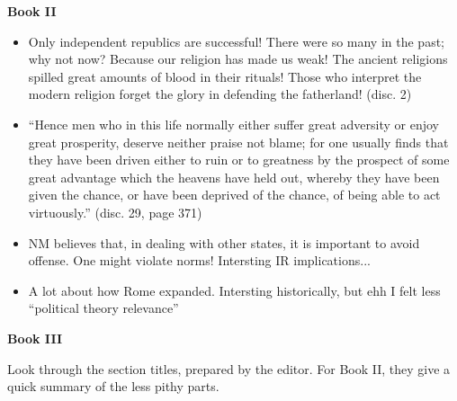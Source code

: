 \documentclass[11pt]{article}
\newcommand{\book}[1]{{\Large {\bfseries Book #1}}}
\newcommand{\p}{page }
\renewcommand{\d}{disc. }
\begin{document}
\book{II}
\begin{itemize}
\item
    Only independent republics are successful! There were so
    many in the past; why not now? Because our religion has
    made us weak! The ancient religions spilled great amounts
    of blood in their rituals! Those who interpret the modern
    religion forget the glory in defending the fatherland! 
    (\d 2)
\item
    ``Hence men who in this life normally either suffer great
    adversity or enjoy great prosperity, deserve neither praise
    not blame; for one usually finds that they have been driven 
    either to ruin or to greatness by the prospect of some great
    advantage which the heavens have held out, whereby they have
    been given the chance, or have been deprived of the chance, of
    being able to act virtuously.'' (\d 29, \p 371)
\item
    NM believes that, in dealing with other states, it is important
    to avoid offense. One might violate norms! Intersting IR
    implications...
\item
    A lot about how Rome expanded. Intersting historically, but ehh
    I felt less ``political theory relevance'' 
\end{itemize}

\book{III} %

Look through the section titles, prepared by the editor. For Book II,
they give a quick summary of the less pithy parts.
\end{document}
